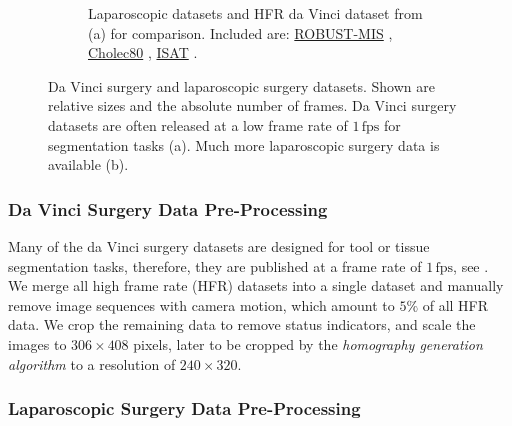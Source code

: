 \begin{figure}
\begin{subfigure}[b]{\textwidth}
    \caption{Laparoscopic datasets and HFR da Vinci dataset from (a) for comparison. Included are: \href{https://robustmis2019.grand-challenge.org/}{ROBUST-MIS} \cite{maier2020heidelberg}, \href{http://camma.u-strasbg.fr/datasets}{Cholec80} \cite{twinanda2016endonet}, \href{https://endovissub-instrument.grand-challenge.org/}{ISAT} \cite{bodenstedt2018comparative}.}
    \label{c2:fig:data_b}
\end{subfigure}    
\caption{Da Vinci surgery and laparoscopic surgery datasets. Shown are relative sizes and the absolute number of frames. Da Vinci surgery datasets are often released at a low frame rate of $1\,\text{fps}$ for segmentation tasks (a). Much more laparoscopic surgery data is available (b).}
\label{c2:fig:data}
\end{figure}

\subsubsection{Da Vinci Surgery Data Pre-Processing}

Many of the da Vinci surgery datasets are designed for tool or tissue segmentation tasks, therefore, they are published at a frame rate of $1\,\text{fps}$, see . We merge all high frame rate (HFR) datasets into a single dataset and manually remove image sequences with camera motion, which amount to $5\%$ of all
HFR data. We crop the remaining data to remove status indicators, and scale the images to $306\times408$ pixels, later to be cropped by the \textit{homography generation algorithm} to a resolution of $240\times320$.

\subsubsection{Laparoscopic Surgery Data Pre-Processing}
\label{c2:sec:lap_pre}

